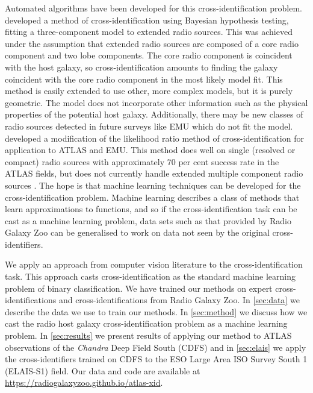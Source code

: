 \documentclass[fleqn,usenatbib,usedcolumn]{mnras}
\begin{document}
  Automated algorithms have been developed for this cross-identification
  problem. \citet{fan15} developed a method of cross-identification using
  Bayesian hypothesis testing, fitting a three-component model to extended
  radio sources. This was achieved under the assumption that extended radio
  sources are composed of a core radio component and two lobe components. The
  core radio component is coincident with the host galaxy, so
  cross-identification amounts to finding the galaxy coincident with the core
  radio component in the most likely model fit. This method is easily extended
  to use other, more complex models, but it is purely geometric. The model
  does not incorporate other information such as the physical properties of
  the potential host galaxy. Additionally, there may be new classes of radio
  sources detected in future surveys like EMU which do not fit the model.
  \citet{weston17} developed a modification of the likelihood ratio method of
  cross-identification \citep{richter75likelihood} for application to ATLAS
  and EMU. This method does well on single (resolved or compact) radio sources
  with approximately 70 per cent success rate in the ATLAS fields, but does
  not currently handle extended multiple component radio sources
  \citep{norris17unexpected}. The hope is that machine learning techniques can
  be developed for the cross-identification problem. Machine learning
  describes a class of methods that learn approximations to functions, and so
  if the cross-identification task can be cast as a machine learning problem,
  data sets such as that provided by Radio Galaxy Zoo can be generalised to
  work on data not seen by the original cross-identifiers.

  We apply an approach from computer vision literature to the
  cross-identification task. This approach casts cross-identification as the
  standard machine learning problem of binary classification. We have trained
  our methods on expert cross-identifications and cross-identifications from
  Radio Galaxy Zoo. In \autoref{sec:data} we describe the data we use to train
  our methods. In \autoref{sec:method} we discuss how we cast the radio host
  galaxy cross-identification problem as a machine learning problem. In
  \autoref{sec:results} we present results of applying our method to ATLAS
  observations of the \emph{Chandra} Deep Field South (CDFS) and in
  \autoref{sec:elais} we apply the cross-identifiers trained on CDFS to the
  ESO Large Area ISO Survey South 1 (ELAIS-S1) field. Our data and code are
  available at \url{https://radiogalaxyzoo.github.io/atlas-xid}.
\end{document}
